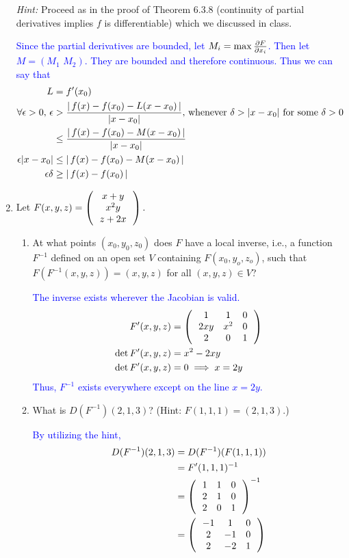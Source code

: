 \documentclass[10pt,a4paper]{report}
\newcommand{\BLUE}[1]{\textcolor{blue}{#1}}
\begin{document}
\begin{enumerate}[label=\Roman*.]
	\textit{Hint: } Proceed as in the proof of Theorem 6.3.8 (continuity of partial derivatives implies $f$ is differentiable) which we discussed in class.

	\BLUE{Since the partial derivatives are bounded, let $M_i =\max \frac{\partial F}{\partial x_i}$.  Then let $M = (M_1\,\, M_2)$.  They are bounded and therefore continuous. Thus we can say that
	\begin{align*}
		L &= f'(x_0) \\
		\forall \epsilon > 0, \, \epsilon &> \frac{ \left |\,  f(x)-f(x_0)-L(x - x_0)  \,\right |}{|x-x_0|}, \, \text{whenever } \delta > |x-x_0| \text{ for some } \delta >0 \\
		&\le \frac{ \left |\,  f(x)-f(x_0)-M(x - x_0)  \,\right |}{|x-x_0|} \\
		\epsilon |x-x_0| &\le \left |\,  f(x)-f(x_0)-M(x - x_0)  \,\right | \\
		\epsilon\delta &\ge \left |\,  f(x)-f(x_0) \,\right |
	\end{align*}
	}
	
	\newpage
	\item Let $F(x,y,z) = \left (\, \begin{array}{c}
		x+y \\
		x^2y \\
		z+2x	
	\end{array}  \,\right ).$
	
	\begin{enumerate}[label=(\alph*)]
		\item At what points $(x_0, y_0, z_0)$ does $F$ have a local inverse, i.e., a function $F^{-1}$ defined on an open set $V$ containing $F(x_0, y_o, z_o)$, such that $F(F^{-1}(x,y,z))=(x,y,z)$ for all $(x,y,z) \in V$?
		
		\BLUE{The inverse exists wherever the Jacobian is valid.
		\begin{align*}
			F'(x,y,z) &= \left (\,  \begin{array}{c c c} 1&1&0 \\ 2xy & x^2 & 0 \\ 2 & 0 & 1 \end{array}  \,\right ) \\
			\det F'(x,y,z) &= x^2 - 2xy \\
			\det F'(x,y,z) &= 0 \implies x=2y
		\end{align*}Thus, $F^{-1}$ exists everywhere except on the line $x=2y$.
		}
		
		\item What is $D(F^{-1})(2,1,3)$?  (Hint: $F(1,1,1)=(2,1,3)$.)
		
		\BLUE{By utilizing the hint, 
		\begin{align*}
			D(F^{-1})(2,1,3) &= D(F^{-1})(F(1,1,1))\\
			&= F'(1,1,1)^{-1} \\
			&= \left (\,  \begin{array}{c c c} 1&1&0 \\ 2 & 1 & 0 \\ 2 & 0 & 1 \end{array}  \,\right )^{-1} \\
			&= \left (\,  \begin{array}{c c c} -1&1&0 \\ 2 & -1 & 0 \\ 2 & -2 & 1 \end{array}  \,\right )
		\end{align*}
		}
	\end{enumerate}
	

\end{enumerate}
\end{document}
